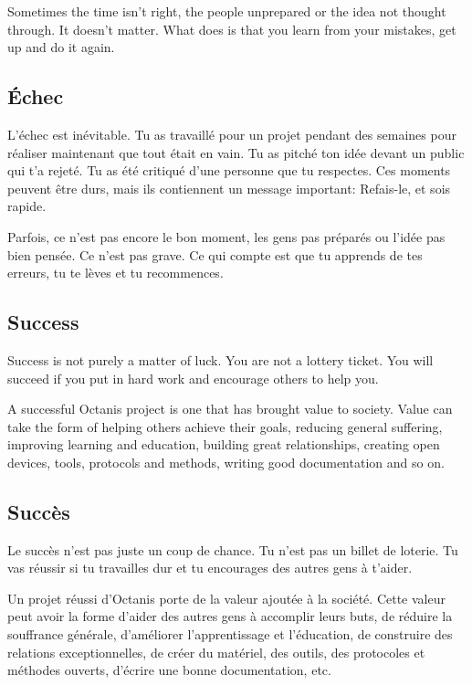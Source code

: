 	Sometimes the time isn't right, the people unprepared or the idea not thought through. It doesn't matter. What does is that you learn from your mistakes, get up and do it again. 



\french
	\subsection{Échec}
	L'échec est inévitable. Tu as travaillé pour un projet pendant des semaines pour réaliser maintenant que tout était en vain. Tu as pitché ton idée devant un public qui t'a rejeté. Tu as été critiqué d'une personne que tu respectes. 
	Ces moments peuvent être durs, mais ils contiennent un message important: Refais-le, et sois rapide.

	Parfois, ce n'est pas encore le bon moment, les gens pas préparés ou l'idée pas bien pensée. Ce n'est pas grave. Ce qui compte est que tu apprends de tes erreurs, tu te lèves et tu recommences. 

\english
	\subsection{Success}
	
	Success is not purely a matter of luck. You are not a lottery ticket. You will succeed if you put in hard work and encourage others to help you. 


	A successful Octanis project is one that has brought value to society. Value can take the form of helping others achieve their goals, reducing general suffering, improving learning and education, building great relationships, creating open devices, tools, protocols and methods, writing good documentation and so on.


\french
	\subsection{Succès}
	Le succès n'est pas juste un coup de chance. Tu n'est pas un billet de loterie. Tu vas réussir si tu travailles dur et tu encourages des autres gens à t'aider. 

	Un projet réussi d'Octanis porte de la valeur ajoutée à la société. Cette valeur peut avoir la forme d'aider des autres gens à accomplir leurs buts, de réduire la souffrance générale, d'améliorer l'apprentissage et l'éducation, de construire des relations exceptionnelles, de créer du matériel, des outils, des protocoles et méthodes ouverts, d'écrire une bonne documentation, etc. 


